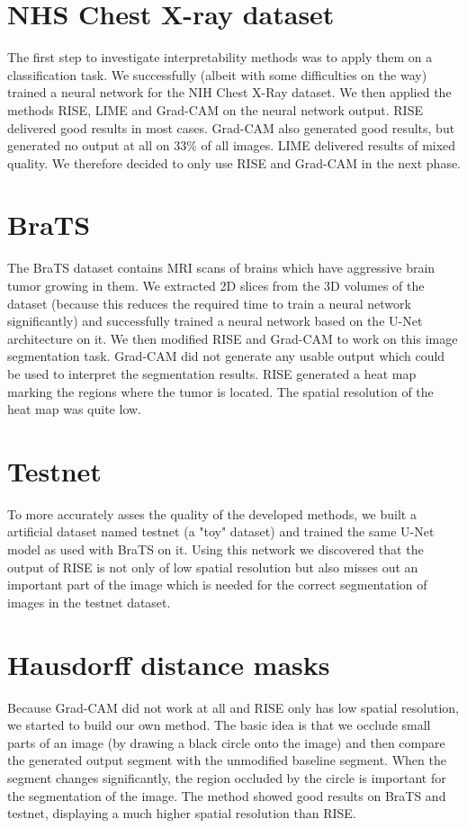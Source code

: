 \section{NHS Chest X-ray dataset}
The first step to investigate interpretability methods was to apply them on a classification task.
We successfully (albeit with some difficulties on the way) trained a neural network for the NIH Chest X-Ray dataset.
We then applied the methods RISE, LIME and Grad-CAM on the neural network output. RISE delivered good results in most cases. Grad-CAM also generated good results, but generated no output at all on 33\% of all images. LIME delivered results of mixed quality. We therefore decided to only use RISE and Grad-CAM in the next phase.

\section{BraTS}
The BraTS dataset contains MRI scans of brains which have aggressive brain tumor growing in them. We extracted 2D slices from the 3D volumes of the dataset (because this reduces the required time to train a neural network significantly) and successfully trained a neural network based on the U-Net architecture on it. We then modified RISE and Grad-CAM to work on this image segmentation task. Grad-CAM did not generate any usable output which could be used to interpret the segmentation results. RISE generated a heat map marking the regions where the tumor is located. The spatial resolution of the heat map was quite low.

\section{Testnet}
To more accurately asses the quality of the developed methods, we built a artificial dataset named testnet (a "toy" dataset) and trained the same U-Net model as used with BraTS on it. Using this network we discovered that the output of RISE is not only of low spatial resolution but also misses out an important part of the image which is needed for the correct segmentation of images in the testnet dataset.

\section{Hausdorff distance masks}
Because Grad-CAM did not work at all and RISE only has low spatial resolution, we started to build our own method. 
The basic idea is that we occlude small parts of an image (by drawing a black circle onto the image) and then compare the generated output segment with the unmodified baseline segment. When the segment changes significantly, the region occluded by the circle is important for the segmentation of the image.
The method showed good results on BraTS and testnet, displaying a much higher spatial resolution than RISE.

